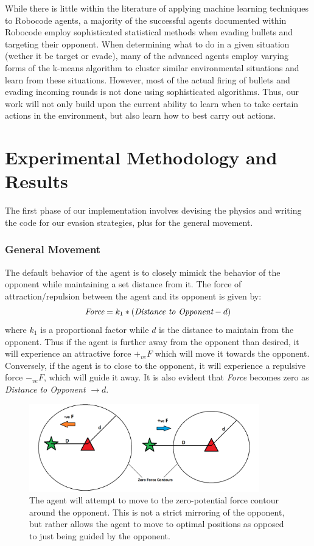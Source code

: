 \documentclass{article}
\theoremstyle{plain}
\theoremstyle{definition}
\theoremstyle{remark}
\begin{document}
While there is little within the literature of applying machine learning techniques to Robocode agents, a majority of the successful agents documented within Robocode employ sophisticated statistical methods when evading bullets and targeting their opponent. When determining what to do in a given situation (wether it be target or evade), many of the advanced agents employ varying forms of the k-means algorithm to cluster similar environmental situations and learn from these situations. However, most of the actual firing of bullets and evading incoming rounds is not done using sophisticated algorithms. Thus, our work will not only build upon the current ability to learn when to take certain actions in the environment, but also learn how to best carry out actions. 

\section{Experimental Methodology and Results}
The first phase of our implementation involves devising the physics and writing the code for our evasion strategies, plus for the general movement.

\subsubsection*{General Movement}
The default behavior of the agent is to closely mimick the behavior of the opponent while maintaining a set distance from it. The force of attraction/repulsion between the agent and its opponent is given by:
$$\emph{Force} = k_1 * (\emph{Distance to Opponent} - d)$$
where $k_1$ is a proportional factor while $d$ is the distance to maintain from the opponent. Thus if the agent is further away from the opponent than desired, it will experience an attractive force $+_{ve}F$ which will move it towards the opponent. Conversely, if the agent is to close to the opponent, it will experience a repulsive force $-_{ve}F$, which will guide it away. It is also evident that \emph{Force} becomes zero as \emph{Distance to Opponent}  $\rightarrow d$.\\ 

\begin{figure}[h]
	\centering
		\includegraphics[width= 10cm]{mirror}
		\caption{The agent will attempt to move to the zero-potential force contour around the opponent. This is not a strict mirroring of the opponent, but rather allows the agent to move to optimal positions as opposed to just being guided by the opponent.}		
	\label{mirror}
\end{figure}
\end{document}
